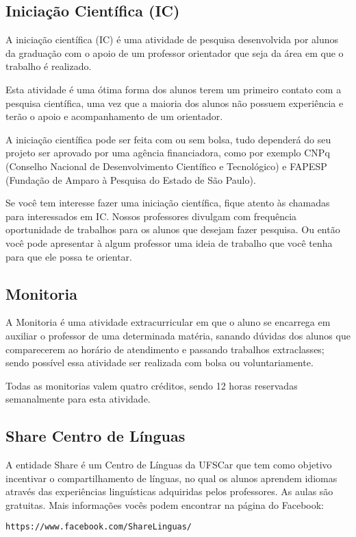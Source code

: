 \subsection{Iniciação Científica (IC)}
A iniciação científica (IC) é uma atividade de pesquisa desenvolvida por alunos da graduação com o apoio de um professor orientador que seja da área em que o trabalho é realizado.

Esta atividade é uma ótima forma dos alunos terem um primeiro contato com a pesquisa científica, uma vez que a maioria dos alunos não possuem experiência e terão o apoio e acompanhamento de um orientador.

A iniciação científica pode ser feita com ou sem bolsa, tudo dependerá do seu projeto ser aprovado por uma agência financiadora,  como por exemplo CNPq (Conselho Nacional de Desenvolvimento Científico e Tecnológico) e FAPESP (Fundação de Amparo à Pesquisa do Estado de São Paulo). 

Se você tem interesse fazer uma iniciação científica, fique atento às chamadas para interessados em IC. Nossos professores divulgam com frequência oportunidade de trabalhos para os alunos que desejam fazer pesquisa. Ou então você pode apresentar à algum professor uma ideia de trabalho que você tenha para que ele possa te orientar.

\subsection{Monitoria}
A Monitoria é uma atividade extracurricular em que o aluno se encarrega em auxiliar o professor de uma determinada matéria, sanando dúvidas dos alunos que comparecerem ao horário de atendimento e passando trabalhos extraclasses; sendo possível essa atividade ser realizada com bolsa ou voluntariamente.

Todas as monitorias valem quatro créditos, sendo 12 horas reservadas semanalmente para esta atividade.

\subsection{Share Centro de Línguas}
A entidade Share é um Centro de Línguas da UFSCar que tem como objetivo incentivar o compartilhamento de línguas, no qual os alunos aprendem idiomas através das experiências linguísticas adquiridas pelos professores. As aulas são gratuitas.
Mais informações vocês podem encontrar na página do Facebook:

\texttt{https://www.facebook.com/ShareLinguas/}
